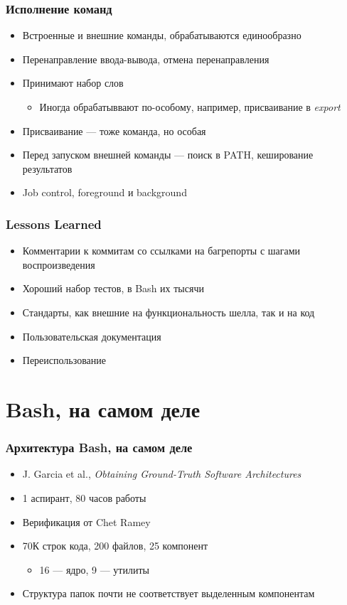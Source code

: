 \documentclass[xetex,mathserif,serif]{beamer}
\begin{document}
	\begin{frame}[fragile]
		\frametitle{Исполнение команд}
		\begin{itemize}
			\item Встроенные и внешние команды, обрабатываются единообразно
			\item Перенаправление ввода-вывода, отмена перенаправления
			\item Принимают набор слов
			\begin{itemize}
				\item Иногда обрабатыввают по-особому, например, присваивание в \textit{export}
			\end{itemize}
			\item Присваивание --- тоже команда, но особая
			\item Перед запуском внешней команды --- поиск в PATH, кеширование результатов
			\item Job control, foreground и background
		\end{itemize}
	\end{frame}

	\begin{frame}[fragile]
		\frametitle{Lessons Learned}
		\begin{itemize}
			\item Комментарии к коммитам со ссылками на багрепорты с шагами воспроизведения
			\item Хороший набор тестов, в Bash их тысячи
			\item Стандарты, как внешние на функциональность шелла, так и на код
			\item Пользовательская документация
			\item Переиспользование
		\end{itemize}
	\end{frame}

	\section{Bash, на самом деле}

	\begin{frame}
		\frametitle{Архитектура Bash, на самом деле}
		\begin{itemize}
			\item J. Garcia et al., \textit{Obtaining Ground-Truth Software Architectures}
			\item 1 аспирант, 80 часов работы
			\item Верификация от Chet Ramey
			\item 70К строк кода, 200 файлов, 25 компонент
			\begin{itemize}
				\item 16 --- ядро, 9 --- утилиты
			\end{itemize}
			\item Структура папок почти не соответствует выделенным компонентам
		\end{itemize}
	\end{frame}
\end{document}
